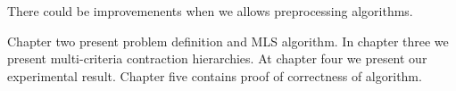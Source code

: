 There could be improvemenents when we allows preprocessing algorithms. 






Chapter two present problem definition and MLS algorithm. In chapter
three we present multi-criteria contraction hierarchies.
At chapter four we present our experimental result.
Chapter five contains proof of correctness of algorithm.


